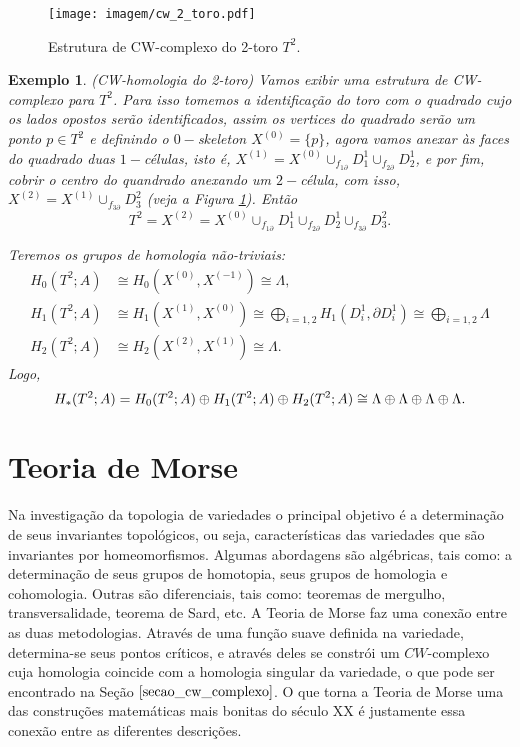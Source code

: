 \documentclass[12pt]{book}
\newtheorem{exemplo}[teorema]{Exemplo}
\newcommand{\celula}[2]{D^{#1}_{#2}}
\newcommand{\homologia}[2]{H_{#1}(#2;A)}
\newcommand{\homologiarelcel}[3]{H_{#1}(D^{#2}_{#3}, \partial D^{#2}_{#3})}
\newcommand{\homologiarelskele}[3]{H_{#1}(X^{(#2)}, X^{(#3)})}
\newcommand{\somadir}[1]{\bigoplus \limits_{#1}}
\newcommand{\skeleton}[1]{X^{(#1)}}
\begin{document}
	\begin{figure}[!h]
		\centering
		\texttt{[image: imagem/cw\_2\_toro.pdf]}
		\caption{Estrutura de CW-complexo do 2-toro $T^{2}$.}
		\label{figura_cw_2_toro}
	\end{figure} 
	
	\begin{exemplo}
		(CW-homologia do 2-toro) Vamos exibir uma estrutura de CW-complexo para $T^{2}$. Para isso tomemos a identificação do toro com o quadrado cujo os lados opostos serão identificados, assim os vertices do quadrado serão um ponto $p \in T^{2}$ e definindo o $0-$skeleton $\skeleton{0} = \{p\}$, agora vamos anexar às faces do quadrado duas $1-$células, isto é, $\skeleton{1} = \skeleton{0}\cup_{f_{1\partial}}\celula{1}{1}\cup_{f_{2\partial}}\celula{1}{2}$, e por fim, cobrir o centro do quandrado anexando um $2-$célula, com isso, $\skeleton{2} = \skeleton{1}\cup_{f_{3\partial}}\celula{2}{3}$ (veja a Figura \ref{figura_cw_2_toro}). Então
		$$
		T^{2} =\skeleton{2} = \skeleton{0}\cup_{f_{1\partial}}\celula{1}{1}\cup_{f_{2\partial}}\celula{1}{2}\cup_{f_{3\partial}}\celula{2}{3}.
		$$
		
		Teremos os grupos de homologia não-triviais:
		$$
		\begin{aligned}
		\homologia{0}{T^{2}} &\cong \homologiarelskele{0}{0}{-1} \cong \Lambda,
		\\
		\homologia{1}{T^{2}} &\cong \homologiarelskele{1}{1}{0} \cong \somadir{i=1,2}\homologiarelcel{1}{1}{i} \cong \somadir{i=1,2}\Lambda
		\\
		\homologia{2}{T^{2}} &\cong \homologiarelskele{2}{2}{1} \cong \Lambda.
		\end{aligned}
		$$
		Logo,
		$$
		\\
		\homologia{*}{T^{2}} = \homologia{0}{T^{2}}\oplus\homologia{1}{T^{2}} \oplus\homologia{2}{T^{2}}\cong \Lambda\oplus\Lambda\oplus\Lambda\oplus\Lambda.
		$$
	\end{exemplo}	
	
	
	\chapter{Teoria de Morse}\label{capitulo_teoria_morse}
	Na investigação da topologia de variedades o principal objetivo é a determinação de seus invariantes topológicos, ou seja, características das variedades que são invariantes por homeomorfismos. Algumas abordagens são algébricas, tais como: a determinação de seus grupos de homotopia, seus grupos de homologia e cohomologia. Outras são diferenciais, tais como: teoremas de mergulho, transversalidade, teorema de Sard, etc. A Teoria de Morse faz uma conexão entre as duas metodologias. Através de uma função suave definida na variedade, determina-se seus pontos críticos, e através deles se constrói um $CW$-complexo cuja homologia coincide com a homologia singular da variedade, o que pode ser encontrado na Seção $\ref{secao_cw_complexo}$. O que torna a Teoria de Morse uma das construções matemáticas mais bonitas do século XX é justamente essa conexão entre as diferentes descrições.
	
\end{document}

